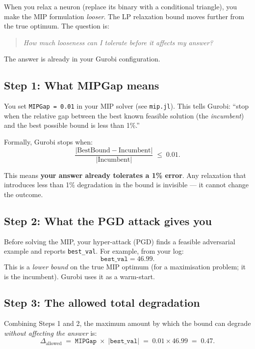 \documentclass[11pt,a4paper]{article}
\begin{document}
When you relax a neuron (replace its binary with a conditional triangle), you
make the MIP formulation \emph{looser}.  The LP relaxation bound moves further
from the true optimum.  The question is:

\begin{quote}
\emph{How much looseness can I tolerate before it affects my answer?}
\end{quote}

The answer is already in your Gurobi configuration.

\subsection{Step 1: What MIPGap means}\label{sec:m7:mipgap}

You set \texttt{MIPGap = 0.01} in your MIP solver (see \texttt{mip.jl}).  This
tells Gurobi: ``stop when the relative gap between the best known feasible
solution (the \emph{incumbent}) and the best possible bound is less than 1\%.''

Formally, Gurobi stops when:
\begin{equation}\label{eq:mipgap}
  \frac{|\text{BestBound} - \text{Incumbent}|}{|\text{Incumbent}|} \;\le\; 0.01.
\end{equation}

This means \textbf{your answer already tolerates a 1\% error}.  Any relaxation
that introduces less than 1\% degradation in the bound is invisible --- it
cannot change the outcome.

\subsection{Step 2: What the PGD attack gives you}\label{sec:m7:pgd}

Before solving the MIP, your hyper-attack (PGD) finds a feasible adversarial
example and reports \texttt{best\_val}.  For example, from your log:
\[
  \texttt{best\_val} = 46.99.
\]
This is a \emph{lower bound} on the true MIP optimum (for a maximisation
problem; it is the incumbent).  Gurobi uses it as a warm-start.

\subsection{Step 3: The allowed total degradation}\label{sec:m7:total}

Combining Steps 1 and 2, the maximum amount by which the bound can degrade
\emph{without affecting the answer} is:
\begin{equation}\label{eq:allowed}
  \Delta_{\mathrm{allowed}}
  \;=\;
  \texttt{MIPGap} \;\times\; |\texttt{best\_val}|
  \;=\;
  0.01 \times 46.99
  \;=\;
  0.47.
\end{equation}
\end{document}
